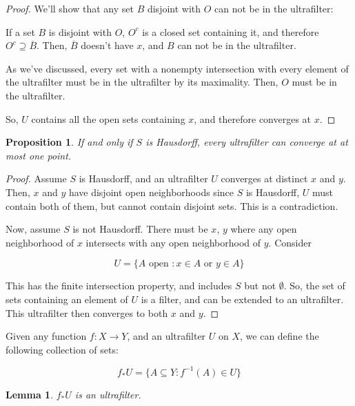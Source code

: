 \documentclass{article}
\newtheorem*{proposition}{Proposition}
\newtheorem*{lemma}{Lemma}
\begin{document}
\begin{proof}
          We'll show that any set $B$ disjoint with $O$ can not be in the
          ultrafilter:

          If a set $B$ is disjoint with $O$, $O^c$ is a closed set containing it,
          and therefore $O^c \supseteq \overline{B}$. Then, $\overline{B}$
          doesn't have $x$, and $B$ can not be in the ultrafilter.

          As we've discussed, every set with a nonempty intersection with every
          element of the ultrafilter must be in the ultrafilter by its
          maximality. Then, $O$ must be in the ultrafilter.

          So, $U$ contains all the open sets containing
          $x$, and therefore converges at $x$.
          \end{proof}

          \begin{proposition}
          If and only if $S$ is Hausdorff, every ultrafilter can converge at at
          most one point.
          \end{proposition}

          \begin{proof}
          Assume $S$ is Hausdorff, and an ultrafilter $U$ converges at distinct
          $x$ and $y$. Then, $x$ and $y$ have disjoint open neighborhoods since
          $S$ is Hausdorff, $U$ must contain both of them, but cannot contain
          disjoint sets. This is a contradiction.

          Now, assume $S$ is not Hausdorff. There must be $x$, $y$ where any
          open neighborhood of $x$ intersects with any open neighborhood of
          $y$. Consider

          \[U = \{A \text{ open }: x \in A \text{ or } y \in A\}\]

          This has the finite intersection property, and includes $S$ but not
          $\emptyset$. So, the set of sets containing an element of $U$ is a
          filter, and can be extended to an ultrafilter. This ultrafilter then
          converges to both $x$ and $y$.
          \end{proof}

          Given any function $f: X \to Y$, and an ultrafilter $U$ on $X$, we can
          define the following collection of sets:

          \[f_*U = \{A \subseteq Y: f^{-1}(A) \in U\}\]

          \begin{lemma}
          $f_*U$ is an ultrafilter.
          \end{lemma}
\end{document}
